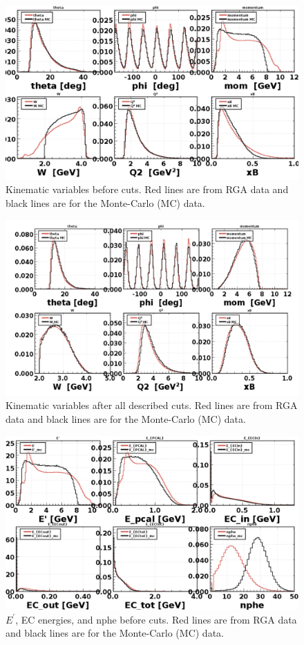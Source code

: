 \begin{figure}[h!]
	\centering
	\includegraphics[width=0.9\linewidth]{figures/rga/uncut/kinematics.png}
	\caption{Kinematic variables before cuts. Red lines are from RGA data and black lines are for the Monte-Carlo (MC) data.}
	\label{fig:rga_kinematics_uncut}
\end{figure}

\begin{figure}[h!]
	\centering
	\includegraphics[width=0.9\linewidth]{figures/rga/kinematics.png}
	\caption{Kinematic variables after all described cuts. Red lines are from RGA data and black lines are for the Monte-Carlo (MC) data.}
	\label{fig:rga_kinematics_cut}
\end{figure}

\newpage
\begin{figure}[h!]
	\centering
	\includegraphics[width=0.9\linewidth]{figures/rga/uncut/energies.png}
	\caption{$E^{\prime}$, EC energies, and nphe before cuts. Red lines are from RGA data and black lines are for the Monte-Carlo (MC) data.}
	\label{fig:rga_energies_uncut}
\end{figure}

